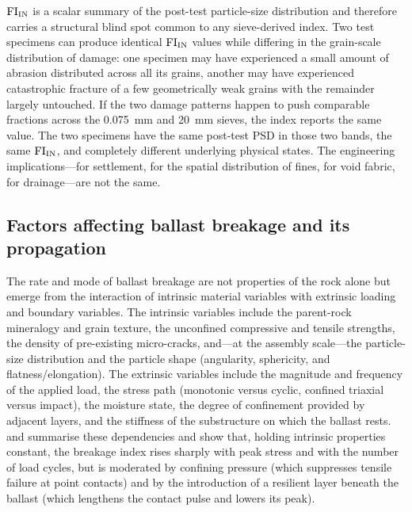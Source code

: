 $\mathrm{FI}_{\mathrm{IN}}$ is a scalar summary of the post-test particle-size distribution and therefore carries a structural blind spot common to any sieve-derived index. Two test specimens can produce identical $\mathrm{FI}_{\mathrm{IN}}$ values while differing in the grain-scale distribution of damage: one specimen may have experienced a small amount of abrasion distributed across all its grains, another may have experienced catastrophic fracture of a few geometrically weak grains with the remainder largely untouched. If the two damage patterns happen to push comparable fractions across the \qty{0.075}{\mm} and \qty{20}{\mm} sieves, the index reports the same value. The two specimens have the same post-test PSD in those two bands, the same $\mathrm{FI}_{\mathrm{IN}}$, and completely different underlying physical states. The engineering implications---for settlement, for the spatial distribution of fines, for void fabric, for drainage---are not the same.

\subsection{Factors affecting ballast breakage and its propagation}
\label{sec:breakage}

The rate and mode of ballast breakage are not properties of the rock alone but emerge from the interaction of intrinsic material variables with extrinsic loading and boundary variables. The intrinsic variables include the parent-rock mineralogy and grain texture, the unconfined compressive and tensile strengths, the density of pre-existing micro-cracks, and---at the assembly scale---the particle-size distribution and the particle shape (angularity, sphericity, and flatness/elongation). The extrinsic variables include the magnitude and frequency of the applied load, the stress path (monotonic versus cyclic, confined triaxial versus impact), the moisture state, the degree of confinement provided by adjacent layers, and the stiffness of the substructure on which the ballast rests. \citet{indraratna2011} and \citet{sun2014} summarise these dependencies and show that, holding intrinsic properties constant, the breakage index rises sharply with peak stress and with the number of load cycles, but is moderated by confining pressure (which suppresses tensile failure at point contacts) and by the introduction of a resilient layer beneath the ballast (which lengthens the contact pulse and lowers its peak).


